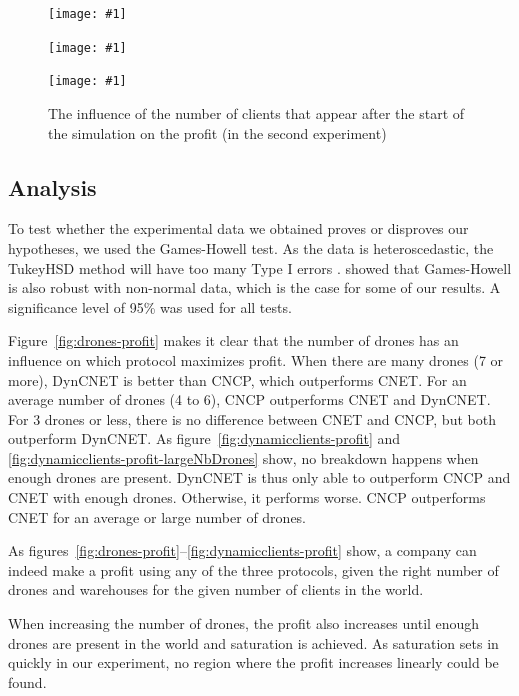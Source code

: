 \documentclass[10pt,a4paper,twocolumn]{article}
\newcommand{\MASplotHelper}[2]{
	\centering
	\texttt{[image: \#1]}
	\caption{#2}
	\label{fig:#1}
}
\newcommand{\MASplotThree}[6]{
\begin{figure}[htp]
    \centering
    \begin{minipage}{\columnwidth}
        \MASplotHelper{#1}{#2}
    \end{minipage}
    \begin{minipage}{\columnwidth}
        \MASplotHelper{#3}{#4}
    \end{minipage}
    \begin{minipage}{\columnwidth}
        \MASplotHelper{#5}{#6}
    \end{minipage}
\end{figure}
}
\begin{document}
\MASplotThree
{drones-delivered}{The influence of the number of drones on the number of clients that are not delivered}
{dynamicclients-delivered-grid2}{The influence of the number of clients that appear after the start of the simulation on the number of clients that are not delivered (in the second experiment) }
{dynamicclients-profit-grid2}{The influence of the number of clients that appear after the start of the simulation on the profit (in the second experiment)}


\subsection{Analysis}
To test whether the experimental data we obtained proves or disproves our hypotheses, we used the Games-Howell test. As the data is heteroscedastic, the TukeyHSD method will have too many Type I errors \cite{SMDA}. \cite{games1979tests} showed that Games-Howell is also robust with non-normal data, which is the case for some of our results. A significance level of 95\% was used for all tests.

Figure~\ref{fig:drones-profit} makes it clear that the number of drones has an influence on which protocol maximizes profit. When there are many drones (7 or more), DynCNET is better than CNCP, which outperforms CNET. For an average number of drones (4 to 6), CNCP outperforms CNET and DynCNET. For 3 drones or less, there is no difference between CNET and CNCP, but both outperform DynCNET. As figure~\ref{fig:dynamicclients-profit} and \ref{fig:dynamicclients-profit-largeNbDrones} show, no breakdown happens when enough drones are present. DynCNET is thus only able to outperform CNCP and CNET with enough drones. Otherwise, it performs worse. CNCP outperforms CNET for an average or large number of drones.


As figures~\ref{fig:drones-profit}--\ref{fig:dynamicclients-profit} show, a company can indeed make a profit using any of the three protocols, given the right number of drones and warehouses for the given number of clients in the world.

When increasing the number of drones, the profit also increases until enough drones are present in the world and saturation is achieved. As saturation sets in quickly in our experiment, no region where the profit increases linearly could be found.
\end{document}
